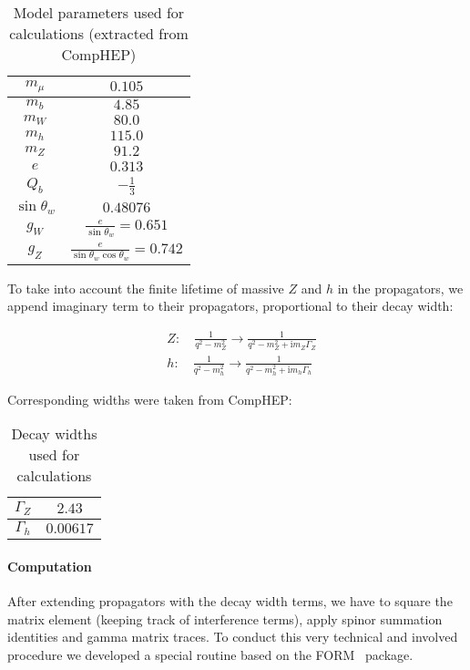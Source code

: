 \documentclass{article}
\newcommand{\ii}{\mathrm{i}}
\begin{document}
\begin{table}[H]
    \centering
    \caption{Model parameters used for calculations (extracted from CompHEP)}
    \label{tab:params}
    \begin{tabular}{cc}
        \toprule
        $m_\mu$ & $ 0.105 $ \\ \midrule
        $m_b$ & $ 4.85 $ \\ \midrule
        $m_W$ & $ 80.0 $ \\ \midrule
        $m_h$ & $ 115.0 $ \\ \midrule
        $m_Z$ & $ 91.2 $ \\ \midrule
        $e$ & $ 0.313 $ \\ \midrule
        $Q_b$ & $ -\frac{1}{3} $ \\ \midrule
        $\sin{\theta_w}$ & $ 0.48076 $ \\ \midrule
        $g_W$ & $\frac{e}{\sin{\theta_w}} = 0.651 $ \\ \midrule
        $g_Z$ & $\frac{e}{\sin{\theta_w} \cos{\theta_w}} = 0.742 $ \\
        \bottomrule
    \end{tabular}
\end{table}

To take into account the finite lifetime of massive $Z$ and $h$ in the propagators, we append imaginary term to their propagators, proportional to their decay width:

\begin{align}
    & Z: \quad \frac{1}{q^2 - m_Z^2} \rightarrow \frac{1}{q^2 - m_Z^2 + \ii m_Z \Gamma_Z} \\
    & h: \quad \frac{1}{q^2 - m_h^2} \rightarrow \frac{1}{q^2 - m_h^2 + \ii m_h \Gamma_h}
\end{align}

Corresponding widths were taken from CompHEP:

\begin{table}[H]
    \centering
    \caption{Decay widths used for calculations}
    \label{tab:widths}
    \begin{tabular}{cc}
        \toprule
        $\Gamma_Z$ & $ 2.43 $ \\ \midrule
        $\Gamma_h$ & $ 0.00617 $ \\
        \bottomrule
    \end{tabular}
\end{table}

\paragraph{Computation} After extending propagators with the decay width terms, we have to square the matrix element (keeping track of interference terms), apply spinor summation identities and gamma matrix traces. To conduct this very technical and involved procedure we developed a special routine based on the FORM~\cite{url:form} package.
\end{document}
